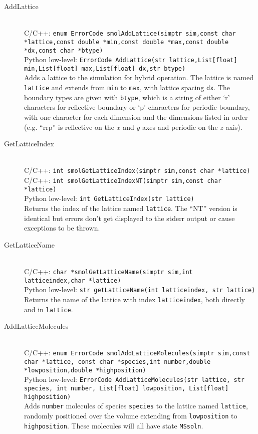\documentclass {book}
\newcommand {\ttt} {\texttt}
\begin{document}
\begin{description}

\item[AddLattice]
\hfill \\
C/C++: \ttt{enum ErrorCode smolAddLattice(simptr sim,const char *lattice,const double *min,const double *max,const double *dx,const char *btype)}\\
Python low-level: \ttt{ErrorCode AddLattice(str lattice,List[float] min,List[float] max,List[float] dx,str btype)}\\
Adds a lattice to the simulation for hybrid operation. The lattice is named \ttt{lattice} and extends from \ttt{min} to \ttt{max}, with lattice spacing \ttt{dx}. The boundary types are given with \ttt{btype}, which is a string of either `r' characters for reflective boundary or `p' characters for periodic boundary, with one character for each dimension and the dimensions listed in order (e.g. ``rrp'' is reflective on the $x$ and $y$ axes and periodic on the $z$ axis).

\item[GetLatticeIndex]
\hfill \\
C/C++: \ttt{int smolGetLatticeIndex(simptr sim,const char *lattice)}\\
C/C++: \ttt{int smolGetLatticeIndexNT(simptr sim,const char *lattice)}\\
Python low-level: \ttt{int GetLatticeIndex(str lattice)}\\
Returns the index of the lattice named \ttt{lattice}. The ``NT'' version is identical but errors don't get displayed to the stderr output or cause exceptions to be thrown.

\item[GetLatticeName]
\hfill \\
C/C++: \ttt{char *smolGetLatticeName(simptr sim,int latticeindex,char *lattice)}\\
Python low-level: \ttt{str getLatticeName(int latticeindex, str lattice)}\\
Returns the name of the lattice with index \ttt{latticeindex}, both directly and in \ttt{lattice}.

\item[AddLatticeMolecules]
\hfill \\
C/C++: \ttt{enum ErrorCode smolAddLatticeMolecules(simptr sim,const char *lattice, const char *species,int number,double *lowposition,double *highposition)}\\
Python low-level: \ttt{ErrorCode AddLatticeMolecules(str lattice, str species, int number, List[float] lowposition, List[float] highposition)}\\
Adds \ttt{number} molecules of species \ttt{species} to the lattice named \ttt{lattice}, randomly positioned over the volume extending from \ttt{lowposition} to \ttt{highposition}. These molecules will all have state \ttt{MSsoln}.


\end{description}
\end{document}
